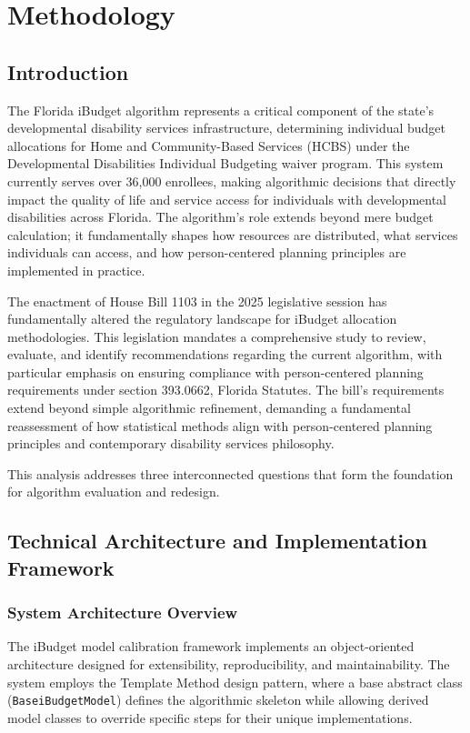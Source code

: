 \chapter{Methodology}


\section{Introduction}

The Florida iBudget algorithm represents a critical component of the state's developmental disability services infrastructure, determining individual budget allocations for Home and Community-Based Services (HCBS) under the Developmental Disabilities Individual Budgeting waiver program. This system currently serves over 36,000 enrollees, making algorithmic decisions that directly impact the quality of life and service access for individuals with developmental disabilities across Florida. The algorithm's role extends beyond mere budget calculation; it fundamentally shapes how resources are distributed, what services individuals can access, and how person-centered planning principles are implemented in practice.

The enactment of House Bill 1103 in the 2025 legislative session has fundamentally altered the regulatory landscape for iBudget allocation methodologies. This legislation mandates a comprehensive study to review, evaluate, and identify recommendations regarding the current algorithm, with particular emphasis on ensuring compliance with person-centered planning requirements under section 393.0662, Florida Statutes. The bill's requirements extend beyond simple algorithmic refinement, demanding a fundamental reassessment of how statistical methods align with person-centered planning principles and contemporary disability services philosophy.

This analysis addresses three interconnected questions that form the foundation for algorithm evaluation and redesign. 


\section{Technical Architecture and Implementation Framework}

\subsection{System Architecture Overview}

The iBudget model calibration framework implements an object-oriented architecture designed for extensibility, reproducibility, and maintainability. The system employs the Template Method design pattern, where a base abstract class (\texttt{BaseiBudgetModel}) defines the algorithmic skeleton while allowing derived model classes to override specific steps for their unique implementations.

